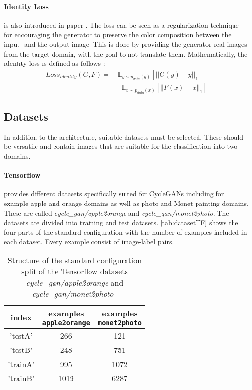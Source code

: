 \documentclass[fleqn,10pt]{SelfArx} %
\begin{document}
\paragraph{Identity Loss} is also introduced in paper \cite{image-to-image-ccan}. The loss can be seen as a regularization technique for encouraging the generator to preserve the color composition between the input- and the output image. This is done by providing the generator real images from the target domain, with the goal to not translate them. Mathematically, the identity loss is defined as follows \cite{image-to-image-ccan}:
\begin{equation*}
\begin{split}
	Loss_{identity}(G,F) =&~\mathbb E_{y \sim p_{data}(y)}[||G(y) - y||_1] \\\
&+ \mathbb E_{x \sim p_{data}(x)}[||F(x)-x||_1]
\end{split}
\end{equation*}

\subsection{Datasets}
In addition to the architecture, suitable datasets must be selected. These should be versatile and contain images that are suitable for the classification into two domains.

\paragraph{Tensorflow} provides different datasets specifically suited for Cycle\ac{GAN}s including for example apple and orange domains as well as photo and Monet painting domains. These are called \textit{cycle\_gan/apple2orange} and \textit{cycle\_gan/monet2photo}. The datasets are divided into training and test datasets. \autoref{tab:datasetTF} shows the four parts of the standard configuration with the number of examples included in each dataset. Every example consist of image-label pairs.~\cite{google-tf-datasets}

\begin{table}[htb]
\centering
\caption{Structure of the standard configuration split of the Tensorflow datasets \textit{cycle\_gan/apple2orange} and \textit{cycle\_gan/monet2photo}~\cite{google-tf-datasets}}
\label{tab:datasetTF}
\begin{tabular}{c c c}
\textbf{index} & \makecell[cc]{\textbf{examples} \\ \textbf{\texttt{apple2orange}}} & \makecell[cc]{\textbf{examples} \\ \textbf{\texttt{monet2photo}}}\\ \hline
'testA' & 266 & 121 \\ \hline
'testB' & 248 & 751 \\ \hline
'trainA' & 995 & 1072 \\ \hline
'trainB' & 1019 & 6287 \\ \hline
\end{tabular}
\end{table}
\end{document}
